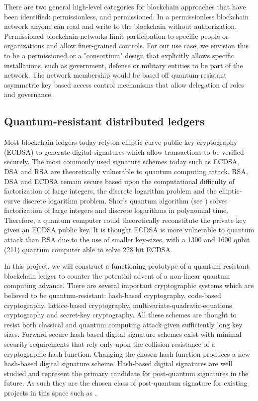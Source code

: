 There are two general high-level categories for blockchain approaches that have been identified: permissionless, and
permissioned. In a permissionless blockchain network anyone can read and write to the blockchain without authorization.
Permissioned blockchain networks limit participation to specific people or organizations and allow finer-grained
controls.  For our use case, we envision this to be a permissioned or a "consortium" design that explicitly allows
specific installations, such as government, defense or military entities to be part of the network.  The network
membership would be based off quantum-resistant asymmetric key based access control mechanisms that allow
delegation of roles and governance.

\subsection{Quantum-resistant distributed ledgers}

Most blockchain ledgers today rely on elliptic curve public-key cryptography (ECDSA) to generate digital signatures
which allow transactions to be verified securely. The most commonly used signature schemes today such as ECDSA, DSA and
RSA are theoretically vulnerable to quantum computing attack. RSA, DSA and ECDSA remain secure based upon the
computational difficulty of factorization of large integers, the discrete logarithm problem and the elliptic-curve
discrete logarithm problem. Shor’s quantum algorithm (see \cite{shor1997}) solves factorization of large integers and discrete
logarithms in polynomial time. Therefore, a quantum computer could theoretically reconstitute the private key given an
ECDSA public key. It is thought ECDSA is more vulnerable to quantum attack than RSA due to the use of smaller key-sizes,
with a 1300 and 1600 qubit (211) quantum computer able to solve 228 bit ECDSA.

In this project, we will construct a functioning prototype of a quantum resistant blockchain ledger to counter the
potential advent of a non-linear quantum computing advance.  There are several important cryptographic systems which are
believed to be quantum-resistant: hash-based cryptography, code-based cryptography, lattice-based cryptography,
multivariate-quadratic-equations cryptography and secret-key cryptography. All these schemes are thought to resist both
classical and quantum computing attack given sufficiently long key sizes.  Forward secure hash-based digital signature
schemes exist with minimal security requirements that rely only upon the collision-resistance of a cryptographic hash
function. Changing the chosen hash function produces a new hash-based digital signature scheme. Hash-based digital
signatures are well studied and represent the primary candidate for post-quantum signatures in the future. As such they
are the chosen class of post-quantum signature for existing projects in this space such as \cite{qrl2016}.


